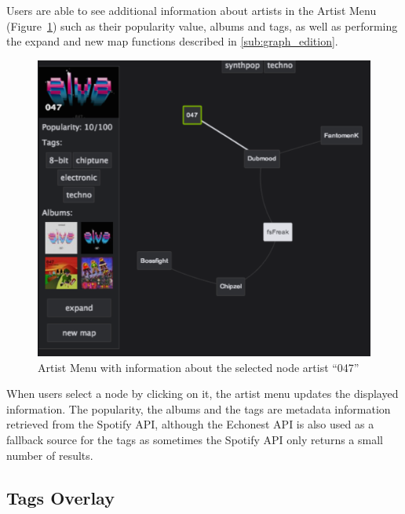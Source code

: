 \documentclass{article}
\begin{document}
      Users are able to see additional information about artists in the Artist Menu (Figure~\ref{fig:artist_menu}) such as their popularity value, albums and tags, as well as performing the expand and new map functions described in \ref{sub:graph_edition}.
      \begin{figure}[hb]
        \begin{center}
          \includegraphics[width=\columnwidth]{../report/figures/artist_menu2.pdf}
        \end{center}
        \caption{Artist Menu with information about the selected node artist ``047''}
        \label{fig:artist_menu}
      \end{figure}
      When users select a node by clicking on it, the artist menu updates the displayed information.
      The popularity, the albums and the tags are metadata information retrieved from the Spotify API, although the Echonest API is also used as a fallback source for the tags  as sometimes the Spotify API only returns a small number of results.

    \subsection{Tags Overlay}
    \label{sub:tags_overlay}
    
\end{document}
